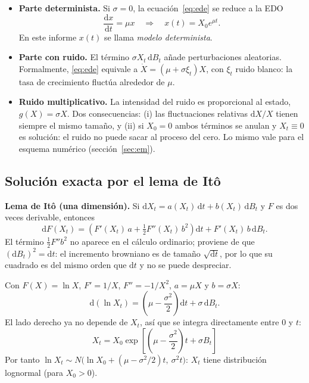 \documentclass[11pt,a4paper]{article}
\newcommand{\dd}{\mathrm{d}}
\begin{document}
\begin{itemize}
    \item \textbf{Parte determinista.} Si $\sigma = 0$, la ecuación~\eqref{eq:ede} se reduce a la EDO
    \begin{equation}
        \frac{\dd x}{\dd t} = \mu x \quad\Longrightarrow\quad x(t) = X_0 e^{\mu t}.
        \label{eq:edo}
    \end{equation}
    En este informe $x(t)$ se llama \emph{modelo determinista}.
    \item \textbf{Parte con ruido.} El término $\sigma X_t\,\dd B_t$ añade perturbaciones aleatorias. Formalmente, \eqref{eq:ede} equivale a $\dot X = (\mu + \sigma \xi_t) X$, con $\xi_t$ ruido blanco: la tasa de crecimiento fluctúa alrededor de $\mu$.
    \item \textbf{Ruido multiplicativo.} La intensidad del ruido es proporcional al estado, $g(X) = \sigma X$. Dos consecuencias: (i) las fluctuaciones relativas $\dd X/X$ tienen siempre el mismo tamaño, y (ii) si $X_0 = 0$ ambos términos se anulan y $X_t \equiv 0$ es solución: el ruido no puede sacar al proceso del cero. Lo mismo vale para el esquema numérico (sección~\ref{sec:em}).
\end{itemize}

\subsection{Solución exacta por el lema de Itô}

\textbf{Lema de Itô (una dimensión).} Si $\dd X_t = a(X_t)\,\dd t + b(X_t)\,\dd B_t$ y $F$ es dos veces derivable, entonces
\begin{equation}
    \dd F(X_t) = \left( F'(X_t)\,a + \tfrac12 F''(X_t)\,b^2 \right)\dd t + F'(X_t)\,b\,\dd B_t .
    \label{eq:ito}
\end{equation}
El término $\tfrac12 F'' b^2$ no aparece en el cálculo ordinario; proviene de que $(\dd B_t)^2 = \dd t$: el incremento browniano es de tamaño $\sqrt{\dd t}$, por lo que su cuadrado es del mismo orden que $\dd t$ y no se puede despreciar.

Con $F(X) = \ln X$, $F' = 1/X$, $F'' = -1/X^2$, $a = \mu X$ y $b = \sigma X$:
\begin{equation}
    \dd(\ln X_t) = \left( \mu - \frac{\sigma^2}{2} \right)\dd t + \sigma\,\dd B_t .
\end{equation}
El lado derecho ya no depende de $X_t$, así que se integra directamente entre $0$ y $t$:
\begin{equation}
    \boxed{X_t = X_0 \exp\!\left[ \left( \mu - \frac{\sigma^2}{2} \right) t + \sigma B_t \right]}
    \label{eq:solucion}
\end{equation}
Por tanto $\ln X_t \sim N\!\big(\ln X_0 + (\mu - \sigma^2/2)t,\ \sigma^2 t\big)$: $X_t$ tiene distribución lognormal (para $X_0 > 0$).
\end{document}
